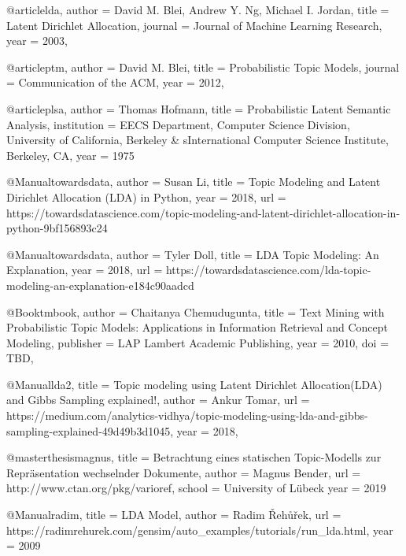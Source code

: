 \documentclass[german,version-2020-11]{uzl-thesis}
\begin{document}
\begin{bibtex-entries}

@article{lda,
  author =       {David M. Blei, Andrew Y. Ng, Michael I. Jordan},
  title =        {Latent Dirichlet Allocation},
  journal =    {Journal of Machine Learning Research},
  year =         {2003},
}

@article{ptm,
  author =       {David M. Blei},
  title =        {Probabilistic Topic Models},
  journal =    {Communication of the ACM},
  year =         {2012},
}

@article{plsa,
  author =       {Thomas Hofmann},
  title =        {Probabilistic Latent Semantic Analysis},
  institution =  {EECS Department, Computer Science Division, University of California, Berkeley  \& sInternational Computer Science Institute, Berkeley, CA},
  year =         {1975}
}

@Manual{towardsdata,
  author =       {Susan Li},
  title =        {Topic Modeling and Latent Dirichlet Allocation (LDA) in Python},
  year =         {2018},
  url =          {https://towardsdatascience.com/topic-modeling-and-latent-dirichlet-allocation-in-python-9bf156893c24}
}

@Manual{towardsdata,
  author =       {Tyler Doll},
  title =        {LDA Topic Modeling: An Explanation},
  year =         {2018},
  url =          {https://towardsdatascience.com/lda-topic-modeling-an-explanation-e184c90aadcd}
}

@Book{tmbook,
  author =       {Chaitanya Chemudugunta},
  title =        {Text Mining with Probabilistic Topic Models: Applications in Information Retrieval and Concept Modeling},
  publisher =    {LAP Lambert Academic Publishing},
  year =         2010,
  doi =          {TBD},
}

@Manual{lda2,
  title =        {Topic modeling using Latent Dirichlet Allocation(LDA) and Gibbs Sampling explained!},
  author =       {Ankur Tomar},
  url =          {https://medium.com/analytics-vidhya/topic-modeling-using-lda-and-gibbs-sampling-explained-49d49b3d1045},
  year =         {2018},
}

@masterthesis{magnus,
  title =        {Betrachtung eines statischen Topic-Modells zur Repräsentation wechselnder Dokumente},
  author =       {Magnus Bender},
  url =          {http://www.ctan.org/pkg/varioref},
school = 	{University of Lübeck}
year =      {2019}
}

@Manual{radim,
  title =        {LDA Model},
  author =       {Radim Řehůřek},
  url =          {https://radimrehurek.com/gensim/auto_examples/tutorials/run_lda.html},
  year =         {2009}
}


\end{bibtex-entries}
\end{document}
